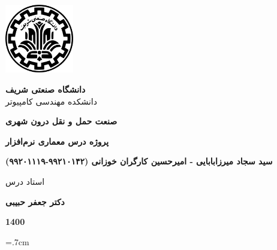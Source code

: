 \thispagestyle{empty}
\begin{center}
\includegraphics[height=3cm]{sut_logo.png}
\vspace{0.4cm}

{\large
	\textbf{دانشگاه صنعتی شریف}\\
	دانشکده مهندسی کامپیوتر
}
\vspace{3.5cm}

{\LARGE
	\textbf{صنعت حمل و نقل درون شهری}\\
}
\vspace{3.5cm}

{\large
	\textbf{پروژه درس معماری نرم‌افزار}\\
}
\vspace{1cm}

{\Large
	\textbf{سید سجاد میرزابابایی - امیرحسین کارگران خوزانی (٩٩٢١٠١۴٢-۹۹۲۰۱۱۱۹)}\\
}
\vspace{2.5cm}

{\large
	استاد درس\\
}
\vspace{0.5cm}

{\Large
	\textbf{دکتر جعفر حبیبی}\\
}
\vspace{3.5cm}

{\Large
	\textbf{1400}
}

\end{center}
\restoregeometry
\pagebreak

%
%
%	
%


\baselineskip=.7cm

